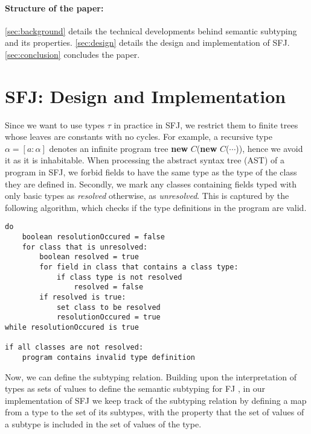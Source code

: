 \documentclass[runningheads]{llncs}
\begin{document}
\paragraph{Structure of the paper:}
\autoref{sec:background} details the technical developments behind semantic subtyping and its properties.
\autoref{sec:design} details the design and implementation of SFJ.
\autoref{sec:conclusion} concludes the paper.



\section{SFJ: Design and Implementation}
\label{sec:design}
Since we want to use types $\tau$ in practice in SFJ, we restrict them to finite trees whose leaves are constants with no cycles.
For example, a recursive type $\alpha = [a : \alpha]$ denotes an infinite program tree \textbf{new} $C$(\textbf{new} $C$($\cdots{}$)), hence we avoid it as it is inhabitable.
When processing the abstract syntax tree (AST) of a program in SFJ, we forbid fields to have the same type as the type of the class they are defined in.
Secondly, we mark any classes containing fields typed with only basic types as \emph{resolved} otherwise, as \emph{unresolved}.
This is captured by the following algorithm, which checks if the type definitions in the program are valid.
\begin{verbatim}
do
    boolean resolutionOccured = false
    for class that is unresolved:
        boolean resolved = true
        for field in class that contains a class type:
            if class type is not resolved
                resolved = false
        if resolved is true:
            set class to be resolved
            resolutionOccured = true
while resolutionOccured is true

if all classes are not resolved:
    program contains invalid type definition
\end{verbatim}
%
Now, we can define the subtyping relation.
Building upon the interpretation of types as sets of values to define the semantic subtyping for FJ \cite{Dardha2013,Dardha2017}, in our implementation of SFJ we keep track of the subtyping relation by defining a map from a type to the set of its subtypes, with the property that the set of values of a subtype is included in the set of values of the type.
\end{document}
